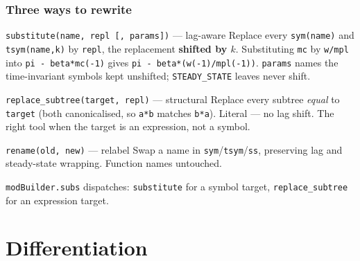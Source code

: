 \documentclass[10pt,slidestop]{beamer}
\newcommand{\code}[1]{\texttt{#1}}
\begin{document}
\begin{frame}\frametitle{Three ways to rewrite}
  \begin{block}{\texttt{substitute(name, repl [, params])} --- lag-aware}
    Replace every \code{sym(name)} and \code{tsym(name,k)} by \code{repl}, the
    replacement \textbf{shifted by $k$}. Substituting \code{mc} by \code{w/mpl}
    into \code{pi - beta*mc(-1)} gives \code{pi - beta*(w(-1)/mpl(-1))}.
    \code{params} names the time-invariant symbols kept unshifted;
    \code{STEADY\_STATE} leaves never shift.
  \end{block}
  \begin{block}{\texttt{replace\_subtree(target, repl)} --- structural}
    Replace every subtree \emph{equal} to \code{target} (both canonicalised, so
    \code{a*b} matches \code{b*a}). Literal --- no lag shift. The right tool when
    the target is an expression, not a symbol.
  \end{block}
  \begin{block}{\texttt{rename(old, new)} --- relabel}
    Swap a name in \code{sym}/\code{tsym}/\code{ss}, preserving lag and
    steady-state wrapping. Function names untouched.
  \end{block}
  \code{modBuilder.subs} dispatches: \code{substitute} for a symbol target,
  \code{replace\_subtree} for an expression target.
\end{frame}

\section{Differentiation}
\end{document}
